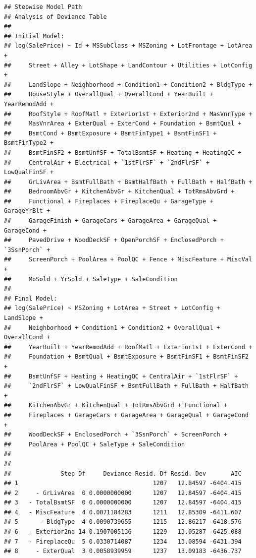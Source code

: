 \documentclass[american,]{article}
\theoremstyle{definition}
\theoremstyle{definition}
\theoremstyle{definition}
\theoremstyle{remark}
\begin{document}
\begin{verbatim}
## Stepwise Model Path 
## Analysis of Deviance Table
## 
## Initial Model:
## log(SalePrice) ~ Id + MSSubClass + MSZoning + LotFrontage + LotArea + 
##     Street + Alley + LotShape + LandContour + Utilities + LotConfig + 
##     LandSlope + Neighborhood + Condition1 + Condition2 + BldgType + 
##     HouseStyle + OverallQual + OverallCond + YearBuilt + YearRemodAdd + 
##     RoofStyle + RoofMatl + Exterior1st + Exterior2nd + MasVnrType + 
##     MasVnrArea + ExterQual + ExterCond + Foundation + BsmtQual + 
##     BsmtCond + BsmtExposure + BsmtFinType1 + BsmtFinSF1 + BsmtFinType2 + 
##     BsmtFinSF2 + BsmtUnfSF + TotalBsmtSF + Heating + HeatingQC + 
##     CentralAir + Electrical + `1stFlrSF` + `2ndFlrSF` + LowQualFinSF + 
##     GrLivArea + BsmtFullBath + BsmtHalfBath + FullBath + HalfBath + 
##     BedroomAbvGr + KitchenAbvGr + KitchenQual + TotRmsAbvGrd + 
##     Functional + Fireplaces + FireplaceQu + GarageType + GarageYrBlt + 
##     GarageFinish + GarageCars + GarageArea + GarageQual + GarageCond + 
##     PavedDrive + WoodDeckSF + OpenPorchSF + EnclosedPorch + `3SsnPorch` + 
##     ScreenPorch + PoolArea + PoolQC + Fence + MiscFeature + MiscVal + 
##     MoSold + YrSold + SaleType + SaleCondition
## 
## Final Model:
## log(SalePrice) ~ MSZoning + LotArea + Street + LotConfig + LandSlope + 
##     Neighborhood + Condition1 + Condition2 + OverallQual + OverallCond + 
##     YearBuilt + YearRemodAdd + RoofMatl + Exterior1st + ExterCond + 
##     Foundation + BsmtQual + BsmtExposure + BsmtFinSF1 + BsmtFinSF2 + 
##     BsmtUnfSF + Heating + HeatingQC + CentralAir + `1stFlrSF` + 
##     `2ndFlrSF` + LowQualFinSF + BsmtFullBath + FullBath + HalfBath + 
##     KitchenAbvGr + KitchenQual + TotRmsAbvGrd + Functional + 
##     Fireplaces + GarageCars + GarageArea + GarageQual + GarageCond + 
##     WoodDeckSF + EnclosedPorch + `3SsnPorch` + ScreenPorch + 
##     PoolArea + PoolQC + SaleType + SaleCondition
## 
## 
##              Step Df     Deviance Resid. Df Resid. Dev       AIC
## 1                                      1207   12.84597 -6404.415
## 2     - GrLivArea  0 0.0000000000      1207   12.84597 -6404.415
## 3   - TotalBsmtSF  0 0.0000000000      1207   12.84597 -6404.415
## 4   - MiscFeature  4 0.0071184283      1211   12.85309 -6411.607
## 5      - BldgType  4 0.0090739655      1215   12.86217 -6418.576
## 6   - Exterior2nd 14 0.1907005136      1229   13.05287 -6425.088
## 7   - FireplaceQu  5 0.0330714087      1234   13.08594 -6431.394
## 8     - ExterQual  3 0.0058939959      1237   13.09183 -6436.737

\end{verbatim}
\end{document}
